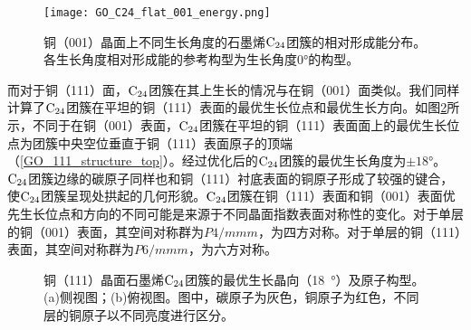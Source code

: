         \begin{figure}[htbp]
            \texttt{[image: GO\_C24\_flat\_001\_energy.png]}
            
            \caption{铜（001）晶面上不同生长角度的石墨烯$\rm{C_{24}}$团簇的相对形成能分布。各生长角度相对形成能的参考构型为生长角度0\si{\degree}的构型。}
            
            \label{GO_001_energy}
        \end{figure}

        而对于铜（111）面，$\rm{C_{24}}$团簇在其上生长的情况与在铜（001）面类似。我们同样计算了$\rm{C_{24}}$团簇在平坦的铜（111）表面的最优生长位点和最优生长方向。如图\ref{GO_111_structure}所示，不同于在铜（001）表面，$\rm{C_{24}}$团簇在平坦的铜（111）表面面上的最优生长位点为团簇中央空位垂直于铜（111）表面原子的顶端（\ref{GO_111_structure_top}）。经过优化后的$\rm{C_{24}}$团簇的最优生长角度为$\pm 18\si{\degree}$。$\rm{C_{24}}$团簇边缘的碳原子同样也和铜（111）衬底表面的铜原子形成了较强的键合，使$\rm{C_{24}}$团簇呈现处拱起的几何形貌。$\rm{C_{24}}$团簇在铜（111）表面和铜（001）表面优先生长位点和方向的不同可能是来源于不同晶面指数表面对称性的变化。对于单层的铜（001）表面，其空间对称群为$P4/mmm$，为四方对称。对于单层的铜（111）表面，其空间对称群为$P6/mmm$，为六方对称。

        \begin{figure}[htbp]
            \caption{铜（111）晶面石墨烯$\rm{C_{24}}$团簇的最优生长晶向（\SI{18}  {\degree}）及原子构型。(a)侧视图；(b)俯视图。图中，碳原子为灰色，铜原子为红色，不同层的铜原子以不同亮度进行区分。
            }    
            \label{GO_111_structure}
            
        \end{figure}


